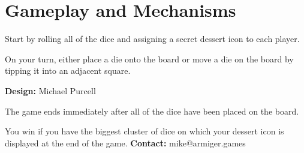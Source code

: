 \documentclass[a5paper, DIV=18, 12pt]{scrartcl}
\begin{document}
\vspace{-1ex}
\section*{\textcolor{MacaronBlue}{\phantom{a}\hfill{}Gameplay and Mechanisms\hfill{}\phantom{a}}}
\begin{multicols}{2}
Start by rolling all of the dice and assigning a secret dessert icon to each player.

\vspace{1ex}

On your turn, either place a die onto the board or move a die on the board by tipping it into an adjacent square.

\vfill\null\textcolor{IceCreamPurple}{\textbf{Design:} Michael Purcell}\columnbreak

The game ends immediately after all of the dice have been placed on the board.

\vspace{1ex}

You win if you have the biggest cluster of dice on which your dessert icon is displayed at the end of the game.
\vfill\null\textcolor{IceCreamPurple}{\textbf{Contact:} mike@armiger.games}
\end{multicols}
\end{document}
